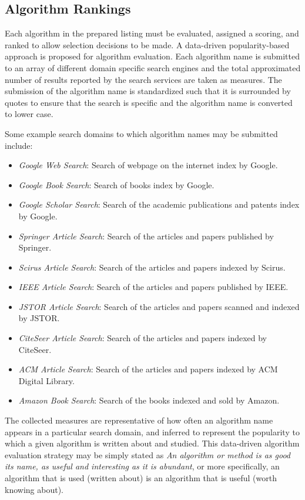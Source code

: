 \documentclass[a4paper, 11pt]{article}
\begin{document}
% 
% 
\subsection{Algorithm Rankings}
Each algorithm in the prepared listing must be evaluated, assigned a scoring, and ranked to allow selection decisions to be made. A data-driven popularity-based approach is proposed for algorithm evaluation. Each algorithm name is submitted to an array of different domain specific search engines and the total approximated number of results reported by the search services are taken as measures. The submission of the algorithm name is standardized such that it is surrounded by quotes to ensure that the search is specific and the algorithm name is converted to lower case. 

Some example search domains to which algorithm names may be submitted include:
\begin{itemize}
	\item \emph{Google Web Search}: Search of webpage on the internet index by Google.
	\item \emph{Google Book Search}: Search of books index by Google.
	\item \emph{Google Scholar Search}: Search of the academic publications and patents index by Google.
	\item \emph{Springer Article Search}: Search of the articles and papers published by Springer.
	\item \emph{Scirus Article Search}: Search of the articles and papers indexed by Scirus.
	\item \emph{IEEE Article Search}: Search of the articles and papers published by IEEE.
	\item \emph{JSTOR Article Search}: Search of the articles and papers scanned and indexed by JSTOR.
	\item \emph{CiteSeer Article Search}: Search of the articles and papers indexed by CiteSeer.
	\item \emph{ACM Article Search}: Search of the articles and papers indexed by ACM Digital Library.
	\item \emph{Amazon Book Search}: Search of the books indexed and sold by Amazon.
\end{itemize}

The collected measures are representative of how often an algorithm name appears in a particular search domain, and inferred to represent the popularity to which a given algorithm is written about and studied. This data-driven algorithm evaluation strategy may be simply stated as \emph{An algorithm or method is as good its name, as useful and interesting as it is abundant}, or more specifically, an algorithm that is used (written about) is an algorithm that is useful (worth knowing about). 
\end{document}
